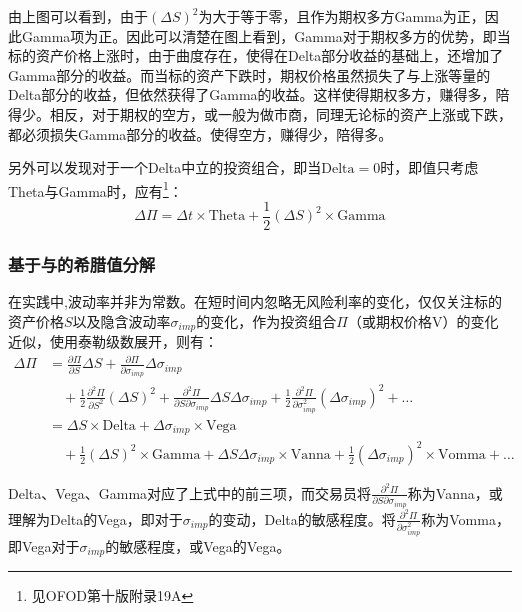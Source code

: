 \documentclass[11pt]{article}
\begin{document}
由上图可以看到，由于$(\Delta S)^2$为大于等于零，且作为期权多方Gamma为正，因此Gamma项为正。因此可以清楚在图上看到，Gamma对于期权多方的优势，即当标的资产价格上涨时，由于曲度存在，使得在Delta部分收益的基础上，还增加了Gamma部分的收益。而当标的资产下跌时，期权价格虽然损失了与上涨等量的Delta部分的收益，但依然获得了Gamma的收益。这样使得期权多方，赚得多，陪得少。相反，对于期权的空方，或一般为做市商，同理无论标的资产上涨或下跌，都必须损失Gamma部分的收益。使得空方，赚得少，陪得多。

另外可以发现对于一个Delta中立的投资组合，即当$\text{Delta}=0$时，即值只考虑Theta与Gamma时，应有\footnote{见OFOD第十版附录19A\label{ofod_19a}}：
\begin{equation*}
    \Delta \Pi = \Delta t \times \text{Theta} + \frac{1}{2} (\Delta S)^2 \times \text{Gamma}
\end{equation*}

\subsubsection{基于与\tops{$\sigma$}的希腊值分解}

在实践中,波动率并非为常数。在短时间内忽略无风险利率的变化，仅仅关注标的资产价格$S$以及隐含波动率$\sigma_{imp}$的变化，作为投资组合$\Pi$（或期权价格V）的变化近似，使用泰勒级数展开，则有：
\begin{align*}
    \Delta \Pi &= \frac{\partial \Pi}{\partial S}\Delta S + \frac{\partial \Pi}{\partial \sigma_{imp}}\Delta \sigma_{imp} \\
    &\quad + \frac{1}{2} \frac{\partial^2 \Pi}{\partial S^2}(\Delta S)^2 + \frac{\partial^2 \Pi}{\partial S \partial \sigma_{imp}}\Delta S \Delta \sigma_{imp} + \frac{1}{2} \frac{\partial^2 \Pi}{\partial \sigma^2_{imp}} (\Delta \sigma_{imp})^2 + \dots \\
    &= \Delta S \times \text{Delta} + \Delta \sigma_{imp} \times \text{Vega} \\
    &\quad + \frac{1}{2} (\Delta S)^2 \times \text{Gamma} + \Delta S \Delta \sigma_{imp} \times \text{Vanna} + \frac{1}{2} (\Delta \sigma_{imp})^2 \times \text{Vomma} + \dots
\end{align*}

Delta、Vega、Gamma对应了上式中的前三项，而交易员将$\tfrac{\partial^2 \Pi}{\partial S\partial \sigma_{imp}}$称为Vanna，或理解为Delta的Vega，即对于$\sigma_{imp}$的变动，Delta的敏感程度。将$\tfrac{\partial^2 \Pi}{\partial \sigma^2_{imp}}$称为Vomma，即Vega对于$\sigma_{imp}$的敏感程度，或Vega的Vega。
\end{document}
